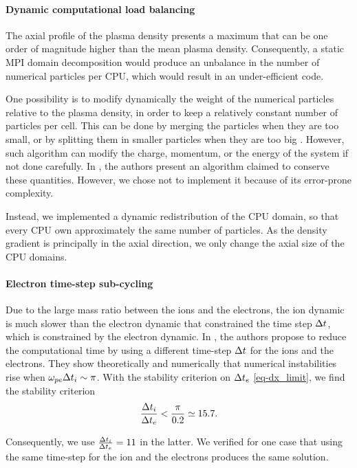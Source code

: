 \paragraph{Dynamic computational load balancing\\}
The axial profile of the plasma density presents a maximum that can be one order of magnitude higher than the mean plasma density.
Consequently, a static MPI domain decomposition would produce an unbalance in the number of numerical particles per CPU, which would result in an under-efficient code.

One possibility is to modify dynamically the weight of the numerical particles relative to the plasma density, in order to keep a relatively constant number of particles per cell.
This can be done by merging the particles when they are too small, or by splitting them in smaller particles when they are too big \citep{shon2001,teunissen2014}.
However, such algorithm can modify the charge, momentum, or the energy of the system if not done carefully.
In \citet{vranic2015}, the authors present an algorithm claimed to conserve these quantities.
However, we chose not to implement it because of its error-prone complexity.

Instead, we implemented a dynamic redistribution of the CPU domain, so that every CPU own approximately the same number of particles.
As the density gradient is principally in the axial direction, we only change the axial size of the CPU domains.

\paragraph{Electron time-step sub-cycling\\}
Due to the large mass ratio between the  ions and the electrons, the ion dynamic is much slower than the electron dynamic that constrained the time step  $\Delta t$, which is constrained by the electron dynamic.
In \citet{adam1982}, the authors propose to reduce the computational time by using a different time-step $\Delta t$ for the ions and the electrons.
They show theoretically and numerically that numerical instabilities rise when $\omega_{pe} \Delta t_i  \sim \pi$.
With the stability criterion on $\Delta t_e$ \cref{eq-dx_limit}, we find the stability criterion 
\begin{equation} \label{eq-subcycling_criterion}
  \frac{\Delta t_i}{\Delta t_e} < \frac{\pi}{0.2} \simeq 15.7.
\end{equation}

Consequently, we use $\frac{\Delta t_i}{\Delta t_e} = 11$ in the latter.
We verified for one case that using the same time-step for the ion and the electrons produces the same solution.



